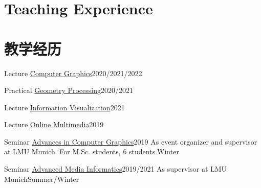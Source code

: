  {
\section{\textbf{Teaching Experience}}
}{
\section{\textbf{教学经历}}
}

\resumeSubHeadingListStartNoLabel
\resumeSubheading
{Lecture \href{http://www.medien.ifi.lmu.de/lehre/ss22/cg1/}{Computer Graphics}}{2020/2021/2022}
{
}{}

\resumeSubheading
{Practical \href{https://www.medien.ifi.lmu.de/lehre/ws2122/gp/}{Geometry Processing}}{2020/2021}
{
}{}

\resumeSubheading
{Lecture \href{https://www.medien.ifi.lmu.de/lehre/ws2122/iv/}{Information Visualization}}{2021}
{
}{}

\resumeSubheading
{Lecture \href{http://www.medien.ifi.lmu.de/lehre/ws1920/omm/}{Online Multimedia}}{2019}
{
}{}

\resumeSubheading
{Seminar \href{http://www.medien.ifi.lmu.de/lehre/ws1920/hs/}{Advances in Computer Graphics}}{2019}
{As event organizer and supervisor at LMU Munich. For M.Sc. students, 6 students.}{Winter}

\resumeSubheading
{Seminar \href{http://www.medien.ifi.lmu.de/lehre/ws2122/hs/}{Advanced Media Informatics}}{2019/2021}
{As supervisor at LMU Munich}{Summer/Winter}

